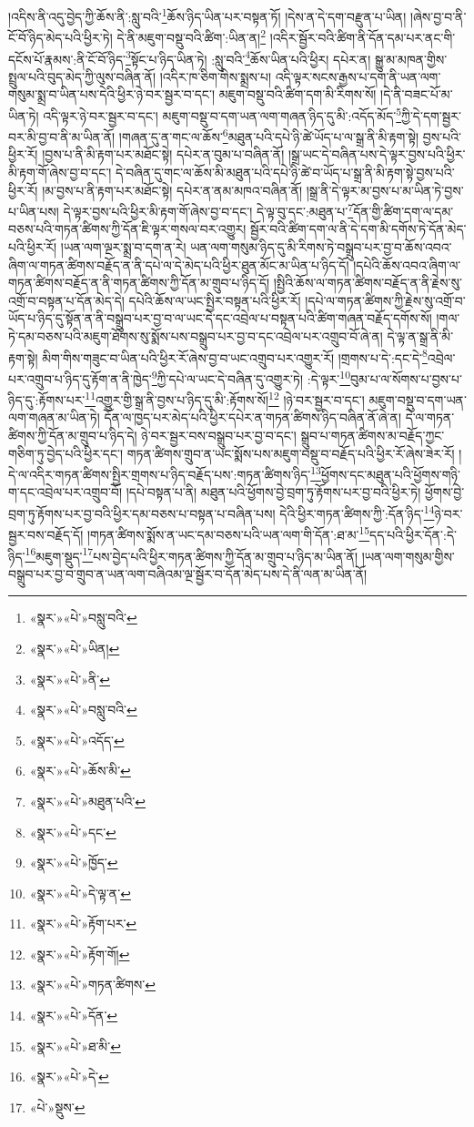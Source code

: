 །འདིས་ནི་འདུ་བྱེད་ཀྱི་ཆོས་ནི་:སླུ་བའི་\footnote{«སྣར་»«པེ་»བསླུ་བའི་}ཆོས་ཉིད་ཡིན་པར་བསྟན་ཏོ། །དེས་ན་དེ་དག་བརྫུན་པ་ཡིན། །ཞེས་བྱ་བ་ནི་ངོ་བོ་ཉིད་མེད་པའི་ཕྱིར་ཏེ། དེ་ནི་མཇུག་བསྡུ་བའི་ཚིག་:ཡིན་ན།\footnote{«སྣར་»«པེ་»ཡིན།} །འདིར་སྦྱོར་བའི་ཚིག་ནི་དོན་དམ་པར་ནང་གི་དངོས་པོ་རྣམས་:ནི་ངོ་བོ་ཉིད་\footnote{«སྣར་»«པེ་»ནི་}སྟོང་པ་ཉིད་ཡིན་ཏེ། :སླུ་བའི་\footnote{«སྣར་»«པེ་»བསླུ་བའི་}ཆོས་ཡིན་པའི་ཕྱིར། དཔེར་ན། སྒྱུ་མ་མཁན་གྱིས་སྤྲུལ་པའི་བུད་མེད་ཀྱི་ལུས་བཞིན་ནོ། །འདིར་ཁ་ཅིག་གིས་སྨྲས་པ། འདི་ལྟར་སངས་རྒྱས་པ་དག་ནི་ཡན་ལག་གསུམ་སྨྲ་བ་ཡིན་པས་དེའི་ཕྱིར་ཉེ་བར་སྦྱར་བ་དང་། མཇུག་བསྡུ་བའི་ཚིག་དག་མི་རིགས་སོ། །དེ་ནི་བཟང་པོ་མ་ཡིན་ཏེ། འདི་ལྟར་ཉེ་བར་སྦྱར་བ་དང་། མཇུག་བསྡུ་བ་དག་ཡན་ལག་གཞན་ཉིད་དུ་མི་:འདོད་མོད་\footnote{«སྣར་»«པེ་»འདོད་}ཀྱི་དེ་དག་སྦྱར་བར་མི་བྱ་བ་ནི་མ་ཡིན་ནོ། །གཞན་དུ་ན་གང་ལ་ཆོས་\footnote{«སྣར་»«པེ་»ཆོས་མི་}མཐུན་པའི་དཔེ་ཉི་ཚེ་ཡོད་པ་ལ་སྒྲ་ནི་མི་རྟག་སྟེ། བྱས་པའི་ཕྱིར་རོ། །བྱས་པ་ནི་མི་རྟག་པར་མཐོང་སྟེ། དཔེར་ན་བུམ་པ་བཞིན་ནོ། །སྒྲ་ཡང་དེ་བཞིན་པས་དེ་ལྟར་བྱས་པའི་ཕྱིར་མི་རྟག་གོ་ཞེས་བྱ་བ་དང་། དེ་བཞིན་དུ་གང་ལ་ཆོས་མི་མཐུན་པའི་དཔེ་ཉི་ཚེ་བ་ཡོད་པ་སྒྲ་ནི་མི་རྟག་སྟེ་བྱས་པའི་ཕྱིར་རོ། །མ་བྱས་པ་ནི་རྟག་པར་མཐོང་སྟེ། དཔེར་ན་ནམ་མཁའ་བཞིན་ནོ། །སྒྲ་ནི་དེ་ལྟར་མ་བྱས་པ་མ་ཡིན་ཏེ་བྱས་པ་ཡིན་པས། དེ་ལྟར་བྱས་པའི་ཕྱིར་མི་རྟག་གོ་ཞེས་བྱ་བ་དང་། དེ་ལྟ་བུ་དང་:མཐུན་པ་\footnote{«སྣར་»«པེ་»མཐུན་པའི་}དོན་གྱི་ཚིག་དག་ལ་དམ་བཅས་པའི་གཏན་ཚིགས་ཀྱི་དོན་ཇི་ལྟར་གསལ་བར་འགྱུར། སྦྱོར་བའི་ཚིག་དག་ལ་ནི་དེ་དག་མི་དགོས་ཏེ་དོན་མེད་པའི་ཕྱིར་རོ། །ཡན་ལག་ལྔར་སྨྲ་བ་དག་ན་རེ། ཡན་ལག་གསུམ་ཉིད་དུ་མི་རིགས་ཏེ་བསྒྲུབ་པར་བྱ་བ་ཆོས་འབའ་ཞིག་ལ་གཏན་ཚིགས་བརྗོད་ན་ནི་དཔེ་ལ་དེ་མེད་པའི་ཕྱིར་ཐུན་མོང་མ་ཡིན་པ་ཉིད་དོ། །དཔེའི་ཆོས་འབའ་ཞིག་ལ་གཏན་ཚིགས་བརྗོད་ན་ནི་གཏན་ཚིགས་ཀྱི་དོན་མ་གྲུབ་པ་ཉིད་དོ། །སྤྱིའི་ཆོས་ལ་གཏན་ཚིགས་བརྗོད་ན་ནི་རྗེས་སུ་འགྲོ་བ་བསྟན་པ་དོན་མེད་དེ། དཔེའི་ཆོས་ལ་ཡང་སྤྱིར་བསྟན་པའི་ཕྱིར་རོ། །དཔེ་ལ་གཏན་ཚིགས་ཀྱི་རྗེས་སུ་འགྲོ་བ་ཡོད་པ་ཉིད་དུ་སྟོན་ན་ནི་བསྒྲུབ་པར་བྱ་བ་ལ་ཡང་དེ་དང་འབྲེལ་པ་བསྟན་པའི་ཚིག་གཞན་བརྗོད་དགོས་སོ། །གལ་ཏེ་དམ་བཅས་པའི་མཇུག་ཐོགས་སུ་སྨོས་པས་བསྒྲུབ་པར་བྱ་བ་དང་འབྲེལ་པར་འགྲུབ་བོ་ཞེ་ན། དེ་ལྟ་ན་སྒྲ་ནི་མི་རྟག་སྟེ། མིག་གིས་གཟུང་བ་ཡིན་པའི་ཕྱིར་རོ་ཞེས་བྱ་བ་ཡང་འགྲུབ་པར་འགྱུར་རོ། །གྲགས་པ་དེ་:དང་དེ་\footnote{«སྣར་»«པེ་»དང་}འབྲེལ་པར་འགྲུབ་པ་ཉིད་དུ་རྟོག་ན་ནི་ཁྱེད་\footnote{«སྣར་»«པེ་»ཁྱོད་}ཀྱི་དཔེ་ལ་ཡང་དེ་བཞིན་དུ་འགྱུར་ཏེ། :དེ་ལྟར་\footnote{«སྣར་»«པེ་»དེ་ལྟ་ན་}བུམ་པ་ལ་སོགས་པ་བྱས་པ་ཉིད་དུ་:རྟོགས་པར་\footnote{«སྣར་»«པེ་»རྟོག་པར་}འགྱུར་གྱི་སྒྲ་ནི་བྱས་པ་ཉིད་དུ་མི་:རྟོགས་སོ།\footnote{«སྣར་»«པེ་»རྟོག་གོ།} །ཉེ་བར་སྦྱར་བ་དང་། མཇུག་བསྡུ་བ་དག་ཡན་ལག་གཞན་མ་ཡིན་ཏེ། དོན་ལ་ཁྱད་པར་མེད་པའི་ཕྱིར་དཔེར་ན་གཏན་ཚིགས་ཉིད་བཞིན་ནོ་ཞེ་ན། དེ་ལ་གཏན་ཚིགས་ཀྱི་དོན་མ་གྲུབ་པ་ཉིད་དེ། ཉེ་བར་སྦྱར་བས་བསྒྲུབ་པར་བྱ་བ་དང་། སྒྲུབ་པ་གཏན་ཚིགས་མ་བརྗོད་ཀྱང་གཅིག་ཏུ་བྱེད་པའི་ཕྱིར་དང་། གཏན་ཚིགས་གྲུབ་ན་ཡང་སྨོས་པས་མཇུག་བསྡུ་བ་བརྗོད་པའི་ཕྱིར་རོ་ཞེས་ཟེར་རོ། །དེ་ལ་འདིར་གཏན་ཚིགས་སྤྱིར་གྲགས་པ་ཉིད་བརྗོད་པས་:གཏན་ཚིགས་ཉིད་\footnote{«སྣར་»«པེ་»གཏན་ཚིགས་}ཕྱོགས་དང་མཐུན་པའི་ཕྱོགས་གཉི་ག་དང་འབྲེལ་པར་འགྲུབ་བོ། །དཔེ་བསྟན་པ་ནི། མཐུན་པའི་ཕྱོགས་བྱེ་བྲག་ཏུ་རྟོགས་པར་བྱ་བའི་ཕྱིར་ཏེ། ཕྱོགས་བྱེ་བྲག་ཏུ་རྟོགས་པར་བྱ་བའི་ཕྱིར་དམ་བཅས་པ་བསྟན་པ་བཞིན་པས། དེའི་ཕྱིར་གཏན་ཚིགས་ཀྱི་:དོན་ཉིད་\footnote{«སྣར་»«པེ་»དོན་}ཉེ་བར་སྦྱར་བས་བརྗོད་དོ། །གཏན་ཚིགས་སྨོས་ན་ཡང་དམ་བཅས་པའི་ཡན་ལག་གི་དོན་:ཐ་མ་\footnote{«སྣར་»«པེ་»ཐ་མི་}དད་པའི་ཕྱིར་དོན་:དེ་ཉིད་\footnote{«སྣར་»«པེ་»དེ་}མཇུག་སྡུད་\footnote{«པེ་»སྡུས་}པས་བྱེད་པའི་ཕྱིར་གཏན་ཚིགས་ཀྱི་དོན་མ་གྲུབ་པ་ཉིད་མ་ཡིན་ནོ། །ཡན་ལག་གསུམ་གྱིས་བསྒྲུབ་པར་བྱ་བ་གྲུབ་ན་ཡན་ལག་བཞིའམ་ལྔ་སྦྱོར་བ་དོན་མེད་པས་དེ་ནི་ལན་མ་ཡིན་ནོ། 